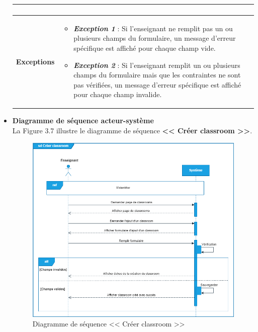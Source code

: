 \begin{itemize}[itemsep=1pt, parsep=1pt]
\begin{longtable}{|>{\RaggedRight\arraybackslash}p{4cm}|>{\RaggedRight\arraybackslash}p{12cm}|}
\begin{itemize}[label=]
\begin{enumerate}
            \end{enumerate}
        \end{itemize} \\
        \hline
        \textbf{Exceptions} & 
        \begin{itemize}[label=--]
            \item \textbf{\textit{Exception 1}} : Si l’enseignant ne remplit pas un ou plusieurs champs du formulaire, un message d’erreur spécifique est affiché pour chaque champ vide. 
            \item \textbf{\textit{Exception 2}} : Si l’enseignant remplit un ou plusieurs champs du formulaire mais que les contraintes ne sont pas vérifiées, un message d’erreur spécifique est affiché pour chaque champ invalide.
        \end{itemize} \\
        \hline
    \end{longtable}
    \newpage
    \item \textbf{Diagramme de séquence acteur-système}\\
    La Figure 3.7 illustre le diagramme de séquence \textbf{<< Créer classroom >>}.
     \begin{figure}[H]
        \centering
        \includegraphics[width=1.1\textwidth,height=0.85\textheight]{images/chp3/fig7.png}
        \caption{Diagramme de séquence << Créer classroom >>}        
        \label{fig:Diagramme de séquence << Créer classroom >>}    
    \end{figure}

\end{itemize}

